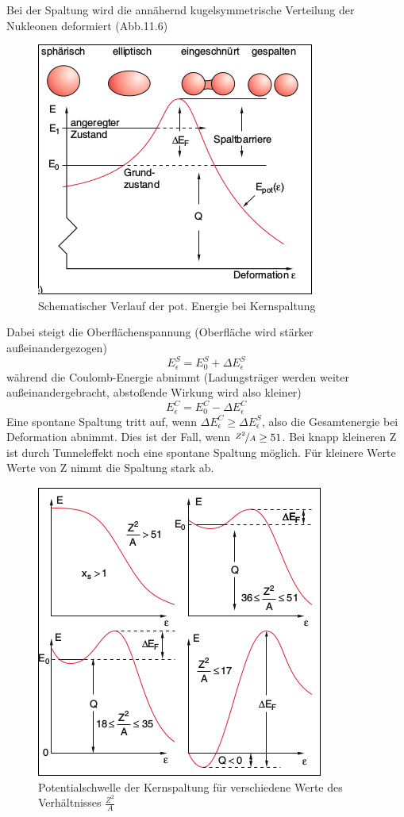 \documentclass[Ex4_Zusammenfassung.tex]{subfiles}
\begin{document}
Bei der Spaltung wird die annähernd kugelsymmetrische Verteilung der Nukleonen deformiert (Abb.11.6)
\begin{figure}[H]
	\centering
	\includegraphics[scale=0.7]{Kernspaltung.png}
	\caption{Schematischer Verlauf der pot. Energie bei Kernspaltung}
\end{figure}
Dabei steigt die Oberflächenspannung (Oberfläche wird stärker außeinandergezogen) 
\begin{equation}
E_{\epsilon}^S = E_0^S + \Delta E_{\epsilon}^S
\end{equation}
während die Coulomb-Energie abnimmt (Ladungsträger werden weiter außeinandergebracht, abstoßende Wirkung wird also kleiner)
\begin{equation}
E_{\epsilon}^C = E_0^C - \Delta E_{\epsilon}^C
\end{equation}
Eine spontane Spaltung tritt auf, wenn $\Delta E_{\epsilon}^C \geq \Delta E_{\epsilon}^S$, also die Gesamtenergie bei Deformation abnimmt. Dies ist der Fall, wenn $\nicefrac{Z^2}{A} \geq 51$. Bei knapp kleineren Z  ist durch Tunneleffekt noch eine spontane Spaltung möglich. Für kleinere Werte Werte von Z nimmt die Spaltung stark ab. 
\begin{figure}[H]
	\centering
	\includegraphics[scale=0.8]{Kernspaltung_Abnahme.png}
	\caption{Potentialschwelle der Kernspaltung für verschiedene Werte des Verhältnisses $\frac{Z^2}{A}$}
\end{figure}
\end{document}
